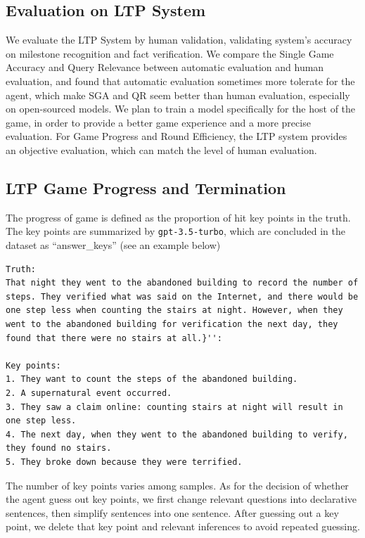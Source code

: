 \subsection{Evaluation on LTP System}
We evaluate the LTP System by human validation, validating system's accuracy on milestone recognition and fact verification. We compare the Single Game Accuracy and Query Relevance between automatic evaluation and human evaluation, and found that automatic evaluation sometimes more tolerate for the agent, which make SGA and QR seem better than human evaluation, especially on open-sourced models. We plan to train a model specifically for the host of the game, in order to provide a better game experience and a more precise evaluation. For Game Progress and Round Efficiency, the LTP system provides an objective evaluation, which can match the level of human evaluation.

\subsection{LTP Game Progress and Termination}
The progress of game is defined as the proportion of hit key points in the truth. The key points are summarized by \texttt{gpt-3.5-turbo}, which are concluded in the dataset as ``answer\_keys'' (see an example below)

\begin{lstlisting}
Truth:
That night they went to the abandoned building to record the number of steps. They verified what was said on the Internet, and there would be one step less when counting the stairs at night. However, when they went to the abandoned building for verification the next day, they found that there were no stairs at all.}'':

Key points:
1. They want to count the steps of the abandoned building. 
2. A supernatural event occurred. 
3. They saw a claim online: counting stairs at night will result in one step less. 
4. The next day, when they went to the abandoned building to verify, they found no stairs. 
5. They broke down because they were terrified.

\end{lstlisting}
The number of key points varies among samples. As for the decision of whether the agent guess out key points, we first change relevant questions into declarative sentences, then simplify sentences into one sentence. After guessing out a key point, we delete that key point and relevant inferences to avoid repeated guessing. 

